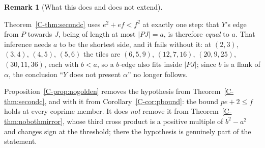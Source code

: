 \documentclass[11pt,reqno]{amsart}
\theoremstyle{plain}
\theoremstyle{definition}
\newtheorem{remark}[theorem]{Remark}
\begin{document}
\begin{remark}[What this does and does not extend]\label{O-abnecessary}

Theorem~\ref{C-thm:secondc} uses $e^{2}+ef<f^{2}$ at exactly one step: that $Y$'s edge from $P$ towards
$J$, being of length at most $|PJ|=a$, is therefore \emph{equal} to $a$. That inference needs $a$ to be
the shortest side, and it fails without it: at $(2,3)$, $(3,4)$, $(4,5)$, $(5,6)$ the tiles are
$(6,5,9)$, $(12,7,16)$, $(20,9,25)$, $(30,11,36)$, each with $b<a$, so a $b$-edge also fits inside
$|PJ|$; since $b$ is a flank of $\alpha$, the conclusion ``$Y$ does not present $\alpha$'' no longer
follows.

Proposition~\ref{C-prop:nogolden} removes the hypothesis from Theorem~\ref{C-thm:secondc}, and with it
from Corollary~\ref{C-cor:pbound}: the bound $pe+2\le f$ holds at every coprime member. It does
\emph{not} remove it from Theorem~\ref{C-thm:nobothmirror}, whose third cross product is a positive
multiple of $b^{2}-a^{2}$ and changes sign at the threshold; there the hypothesis is genuinely part of
the statement.
\end{remark}
\end{document}
